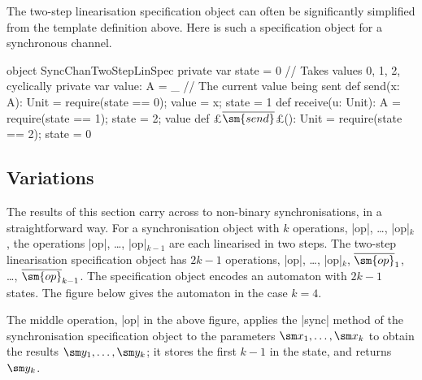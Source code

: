 
The two-step linearisation specification object can often be significantly
simplified from the template definition above.  Here is such a specification
object for a synchronous channel.
%
\begin{scala}
object SyncChanTwoStepLinSpec{
  private var state = 0        // Takes values 0, 1, 2, cyclically 
  private var value: A = _    // The current value being sent
  def send(x: A): Unit = { require(state == 0); value = x; state = 1 }
  def receive(u: Unit): A = { require(state == 1); state = 2; value }
  def £$\overline{\sm{send}}$£(): Unit = { require(state == 2); state = 0 }
}
\end{scala}


\subsection{Variations}
\label{ssec:relating-variations}

The results of this section carry across to non-binary synchronisations, in a
straightforward way.  For a synchronisation object with $k$ operations,
|op|, \ldots, |op|$_k$, the operations |op|, \ldots, |op|$_{k-1}$ are
each linearised in two steps.  The two-step linearisation specification object
has $2k-1$ operations, |op|, \ldots, |op|$_k$, $\overline{\sm{op}}_1$,
\ldots, $\overline{\sm{op}}_{k-1}$.  The specification object encodes an
automaton with $2k-1$ states.  The figure below gives the automaton in the
case $k = 4$.
%
\begin{center}
\end{center}
%
The middle operation, |op| in the above figure, applies the |sync| method
of the synchronisation specification object to the parameters $\sm x_1,
\ldots, \sm x_k$ to obtain the results $\sm y_1, \ldots, \sm y_k$; it
stores the first $k-1$ in the state, and returns $\sm y_k$. 
